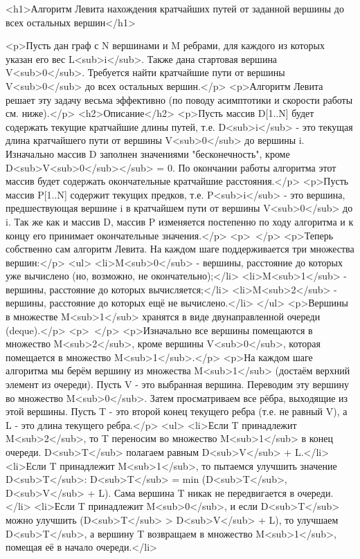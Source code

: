 <h1>Алгоритм Левита нахождения кратчайших путей от заданной вершины до всех остальных вершин</h1>

<p>Пусть дан граф с N вершинами и M ребрами, для каждого из которых указан его вес L<sub>i</sub>. Также дана стартовая вершина V<sub>0</sub>. Требуется найти кратчайшие пути от вершины V<sub>0</sub> до всех остальных вершин.</p>
<p>Алгоритм Левита решает эту задачу весьма эффективно (по поводу асимптотики и скорости работы см. ниже).</p>
<h2>Описание</h2>
<p>Пусть массив D[1..N] будет содержать текущие кратчайшие длины путей, т.е. D<sub>i</sub> - это текущая длина кратчайшего пути от вершины V<sub>0</sub> до вершины i. Изначально массив D заполнен значениями "бесконечность", кроме D<sub>V<sub>0</sub></sub> = 0. По окончании работы алгоритма этот массив будет содержать окончательные кратчайшие расстояния.</p>
<p>Пусть массив P[1..N] содержит текущих предков, т.е. P<sub>i</sub> - это вершина, предшествующая вершине i в кратчайшем пути от вершины V<sub>0</sub> до i. Так же как и массив D, массив P изменяется постепенно по ходу алгоритма и к концу его принимает окончательные значения.</p>
<p> </p>
<p>Теперь собственно сам алгоритм Левита. На каждом шаге поддерживается три множества вершин:</p>
<ul>
<li>M<sub>0</sub> - вершины, расстояние до которых уже вычислено (но, возможно, не окончательно);</li>
<li>M<sub>1</sub> - вершины, расстояние до которых вычисляется;</li>
<li>M<sub>2</sub> - вершины, расстояние до которых ещё не вычислено.</li>
</ul>
<p>Вершины в множестве M<sub>1</sub> хранятся в виде двунаправленной очереди (deque).</p>
<p> </p>
<p>Изначально все вершины помещаются в множество M<sub>2</sub>, кроме вершины V<sub>0</sub>, которая помещается в множество M<sub>1</sub>.</p>
<p>На каждом шаге алгоритма мы берём вершину из множества M<sub>1</sub> (достаём верхний элемент из очереди). Пусть V - это выбранная вершина. Переводим эту вершину во множество M<sub>0</sub>. Затем просматриваем все рёбра, выходящие из этой вершины. Пусть T - это второй конец текущего ребра (т.е. не равный V), а L - это длина текущего ребра.</p>
<ul>
<li>Если T принадлежит M<sub>2</sub>, то T переносим во множество M<sub>1</sub> в конец очереди. D<sub>T</sub> полагаем равным D<sub>V</sub> + L.</li>
<li>Если T принадлежит M<sub>1</sub>, то пытаемся улучшить значение D<sub>T</sub>: D<sub>T</sub> = min (D<sub>T</sub>, D<sub>V</sub> + L). Сама вершина T никак не передвигается в очереди.</li>
<li>Если T принадлежит M<sub>0</sub>, и если D<sub>T</sub> можно улучшить (D<sub>T</sub> > D<sub>V</sub> + L), то улучшаем D<sub>T</sub>, а вершину T возвращаем в множество M<sub>1</sub>, помещая её в начало очереди.</li>
